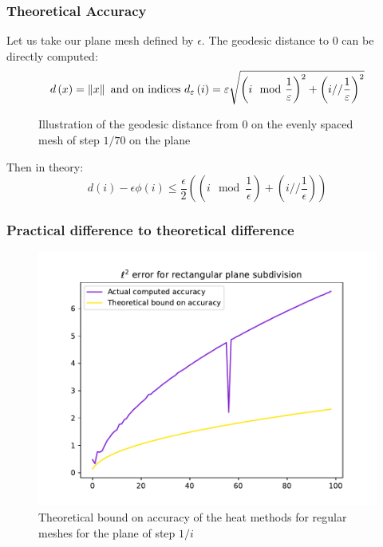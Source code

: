 \documentclass{beamercours}
\begin{document}
\begin{frame}[allowframebreaks]
	\frametitle{Theoretical Accuracy}
	Let us take our plane mesh defined by $\epsilon$. The geodesic distance to $0$ can be directly computed:
	\begin{equation*}
		d\left( x \right) = \left\lVert x \right\rVert \text{ and on indices } d_{\varepsilon}\left( i \right) = \varepsilon\sqrt{\left( i \mod \frac{1}{\varepsilon} \right)^{2} + \left( i // \frac{1}{\varepsilon} \right)^{2}}
	\end{equation*}
	\framebreak

	\begin{figure}[H]
		\centering
		\caption{Illustration of the geodesic distance from $0$ on the evenly spaced mesh of step $1/70$ on the plane}
	\end{figure}
	\framebreak

	Then in theory:
	\begin{equation*}
		d\left( i \right) - \epsilon\phi\left( i \right) \leq \frac{\epsilon}{2} \left(\left( i \mod \frac{1}{\epsilon} \right) + \left(i // \frac{1}{\epsilon} \right) \right)
	\end{equation*}
\end{frame}

\begin{frame}
	\frametitle{Practical difference to theoretical difference}
	\begin{figure}[H]
		\centering
		\includegraphics[scale=.4]{Figures/compare_err_comp_planes_i<=100}
		\caption{Theoretical bound on accuracy of the heat methods for regular meshes for the plane of step $1/i$}
	\label{planediff}
\end{figure}
\end{frame}
\end{document}
